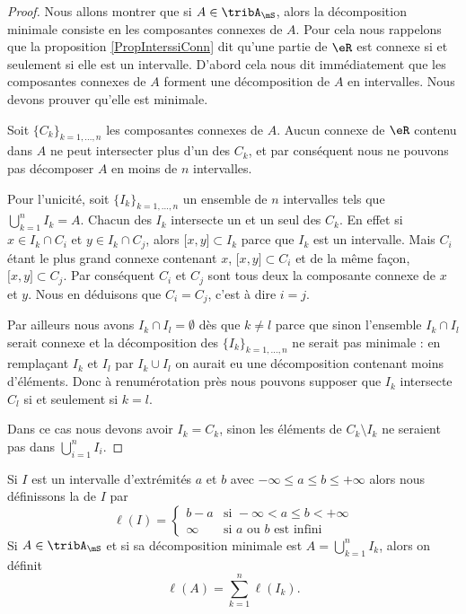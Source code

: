 \begin{proof}
    Nous allons montrer que si \( A\in\tribA_{\mS}\), alors la décomposition minimale consiste en les composantes connexes de \( A\). Pour cela nous rappelons que la proposition \ref{PropInterssiConn} dit qu'une partie de \( \eR\) est connexe si et seulement si elle est un intervalle. D'abord cela nous dit immédiatement que les composantes connexes de \( A\) forment une décomposition de \( A\) en intervalles. Nous devons prouver qu'elle est minimale.

    Soit \( \{ C_k \}_{k=1,\ldots, n}\) les composantes connexes de \( A\). Aucun connexe de \( \eR\) contenu dans \( A\) ne peut intersecter plus d'un des \( C_k\), et par conséquent nous ne pouvons pas décomposer \( A\) en moins de \( n\) intervalles. 
    
    Pour l'unicité, soit \( \{ I_k \}_{k=1,\ldots, n}\) un ensemble de \( n\) intervalles tels que \( \bigcup_{k=1}^nI_k=A\). Chacun des \( I_k\) intersecte un et un seul des \( C_k\). En effet si \( x\in I_k\cap C_i\) et \( y\in I_k\cap C_j\), alors \( \mathopen[ x , y \mathclose]\subset I_k\) parce que \( I_k\) est un intervalle. Mais \( C_i\) étant le plus grand connexe contenant \( x\), \( \mathopen[ x , y \mathclose]\subset C_i\) et de la même façon, \( \mathopen[ x , y \mathclose]\subset C_j\). Par conséquent \( C_i\) et \( C_j\) sont tous deux la composante connexe de \( x\) et \( y\). Nous en déduisons que \( C_i=C_j\), c'est à dire \( i=j\).

    Par ailleurs nous avons \( I_k\cap I_l=\emptyset\) dès que \( k\neq l\) parce que sinon l'ensemble \( I_k\cap I_l\) serait connexe et la décomposition des \( \{ I_k \}_{k=1,\ldots, n} \) ne serait pas minimale : en remplaçant \( I_k\) et \( I_l\) par \( I_k\cup I_l\) on aurait eu une décomposition contenant moins d'éléments. Donc à renumérotation près nous pouvons supposer que \( I_k\) intersecte \( C_l\) si et seulement si \( k=l\).

    Dans ce cas nous devons avoir \( I_k=C_k\), sinon les éléments de \( C_k\setminus I_k\) ne seraient pas dans \( \bigcup_{i=1}^nI_i\).
\end{proof}

\begin{definition}
    Si \( I\) est un intervalle d'extrémités \( a\) et \( b\) avec \( -\infty\leq a\leq b\leq +\infty\) alors nous définissons la  de \( I\) par
    \begin{equation}
        \ell(I)=\begin{cases}
            b-a    &   \text{si } -\infty<a\leq b< +\infty\\
            \infty    &    \text{si } a\text{ ou } b\text{ est infini}
        \end{cases}
    \end{equation}
    Si \( A\in\tribA_{\mS}\) et si sa décomposition minimale est \( A=\bigcup_{k=1}^nI_k\), alors on définit
    \begin{equation}
        \ell(A)=\sum_{k=1}^n\ell(I_k).
    \end{equation}
\end{definition}

